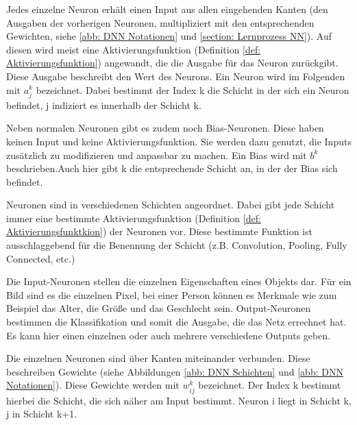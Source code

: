 Jedes einzelne Neuron erhält einen Input aus allen eingehenden Kanten (den Ausgaben der vorherigen Neuronen, multipliziert mit den entsprechenden Gewichten, siehe \ref{abb: DNN Notationen} und \ref{section: Lernprozess NN}). Auf diesen wird meist eine Aktivierungsfunktion (Definition \ref{def: Aktivierungsfunktion}) angewandt, die die Ausgabe für das Neuron zurückgibt. Diese Ausgabe beschreibt den Wert des Neurons. \cite{Montavon ?? } 
Ein Neuron wird im Folgenden mit $a_j^k$ bezeichnet. Dabei bestimmt der Index k die Schicht in der sich ein Neuron befindet, j indiziert es innerhalb der Schicht k.

Neben \glqq normalen \grqq Neuronen gibt es zudem noch Bias-Neuronen. Diese haben keinen Input und keine Aktivierungsfunktion. Sie werden dazu genutzt, die Inputs zusätzlich zu modifizieren und anpassbar zu machen. \cite{Montavon ??}  Ein Bias wird mit $b^k$ beschrieben.Auch hier gibt k die entsprechende Schicht an, in der der Bias sich befindet.


Neuronen sind in verschiedenen Schichten angeordnet. Dabei gibt jede Schicht immer eine bestimmte Aktivierungsfunktion (Definition \ref{def: Aktivierungsfunktkion}) der Neuronen vor. Diese bestimmte Funktion ist ausschlaggebend für die Benennung der Schicht (z.B. Convolution, Pooling, Fully Connected, etc.) 

Die Input-Neuronen stellen die einzelnen Eigenschaften eines Objekts dar. Für ein Bild sind es die einzelnen Pixel, bei einer Person können es Merkmale wie zum Beispiel das Alter, die Größe und das Geschlecht sein. \cite{Goodfellow-et-al-2016} 
Output-Neuronen bestimmen die Klassifikation und somit die Ausgabe, die das Netz errechnet hat. Es kann hier einen einzelnen oder auch mehrere verschiedene Outputs geben. \cite{Goodfellow-et-al-2016} 

Die einzelnen Neuronen sind über Kanten miteinander verbunden. Diese beschreiben Gewichte (siehe Abbildungen \ref{abb: DNN Schichten} und \ref{abb: DNN Notationen}). \cite{Goodfellow-et-al-2016} 
Diese Gewichte werden mit $w_{ij}^k$ bezeichnet. Der Index k bestimmt hierbei die Schicht, die sich näher am Input bestimmt. Neuron i liegt in Schicht k, j in Schicht k+1.

